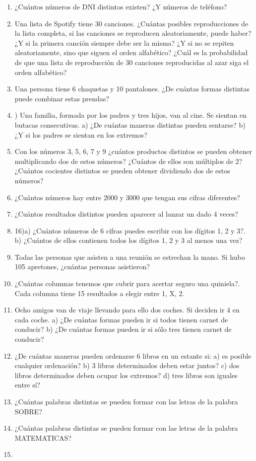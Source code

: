 \begin{enumerate}
	\item ¿Cuántos números de DNI distintos existen? ¿Y números de teléfono?
	\item Una lista de Spotify tiene 30 canciones. ¿Cuántas posibles reproducciones de la lista completa, si las canciones se reproducen aleatoriamente, puede haber? ¿Y si la primera canción siempre debe ser la misma? ¿Y si no se repiten aleatoriamente, sino que siguen el orden alfabético?
	\subitem ¿Cuál es la probabilidad de que una lista de reproducción de 30 canciones reproducidas al azar siga el orden alfabético?
	\item Una persona tiene 6 chaquetas y 10 pantalones. ¿De cuántas formas distintas puede combinar estas prendas?
	\item ) Una familia, formada por los padres y tres hijos, van al cine. Se sientan en butacas consecutivas.
		\subitem a) ¿De cuántas maneras distintas pueden sentarse?
		\subitem b) ¿Y si los padres se sientan en los extremos?
	\item Con los números 3, 5, 6, 7 y 9 
		\subitem ¿cuántos productos distintos se pueden obtener multiplicando dos de estos números? 
		\subitem ¿Cuántos de ellos son múltiplos de 2? 
		\subitem ¿Cuántos cocientes distintos se pueden obtener dividiendo dos de estos números?
	\item ¿Cuántos números hay entre 2000 y 3000 que tengan sus cifras diferentes?
	\item ¿Cuántos resultados distintos pueden aparecer al lanzar un dado 4 veces?
	\item 16)a) ¿Cuántos números de 6 cifras puedes escribir con los dígitos 1, 2 y 3?. b) ¿Cuántos de ellos contienen todos los dígitos 1, 2 y 3 al menos una vez?
	\item Todas las personas que asisten a una reunión se estrechan la mano. Si hubo 105 apretones, ¿cuántas personas asistieron?
	\item ¿Cuántas columnas tenemos que cubrir para acertar seguro una quiniela?. Cada columna tiene 15 resultados a elegir entre 1, X, 2. 
	\item Ocho amigos van de viaje llevando para ello dos coches. Si deciden ir 4 en cada coche.
		\subitem a) ¿De cuántas formas pueden ir si todos tienen carnet de conducir?
		\subitem b) ¿De cuántas formas pueden ir si sólo tres tienen carnet de conducir?
	\item  ¿De cuántas maneras pueden ordenarse 6 libros en un estante si:
		\subitem a) es posible cualquier ordenación?
		\subitem b) 3 libros determinados deben estar juntos?
		\subitem c) dos libros determinados deben ocupar los extremos?
		\subitem d) tres libros son iguales entre sí?
	\item ¿Cuántas palabras distintas se pueden formar con las letras de la palabra SOBRE?
	\item ¿Cuántas palabras distintas se pueden formar con las letras de la palabra MATEMATICAS?
	\item 
\end{enumerate}

